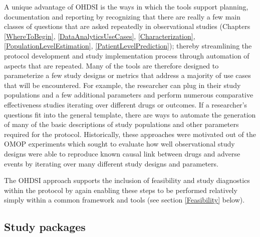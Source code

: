 \documentclass[11pt]{book}
\theoremstyle{definition}
\theoremstyle{definition}
\theoremstyle{definition}
\theoremstyle{remark}
\begin{document}
A unique advantage of OHDSI is the ways in which the tools support planning, documentation and reporting by recognizing that there are really a few main classes of questions that are asked repeatedly in observational studies (Chapters \ref{WhereToBegin}, \ref{DataAnalyticsUseCases}, \ref{Characterization}, \ref{PopulationLevelEstimation}, \ref{PatientLevelPrediction}); thereby streamlining the protocol development and study implementation process through automation of aspects that are repeated.
Many of the tools are therefore designed to parameterize a few study designs or metrics that address a majority of use cases that will be encountered. For example, the researcher can plug in their study populations and a few additional parameters and perform numerous comparative effectiveness studies iterating over different drugs or outcomes. If a researcher's questions fit into the general template, there are ways to automate the generation of many of the basic descriptions of study populations and other parameters required for the protocol. Historically, these approaches were motivated out of the OMOP experiments which sought to evaluate how well observational study designs were able to reproduce known causal link between drugs and adverse events by iterating over many different study designs and parameters.

The OHDSI approach supports the inclusion of feasibility and study diagnostics within the protocol by again enabling these steps to be performed relatively simply within a common framework and tools (see section \ref{Feasibility} below).

\hypertarget{study-packages}{%
\subsection{Study packages}\label{study-packages}}
\end{document}
